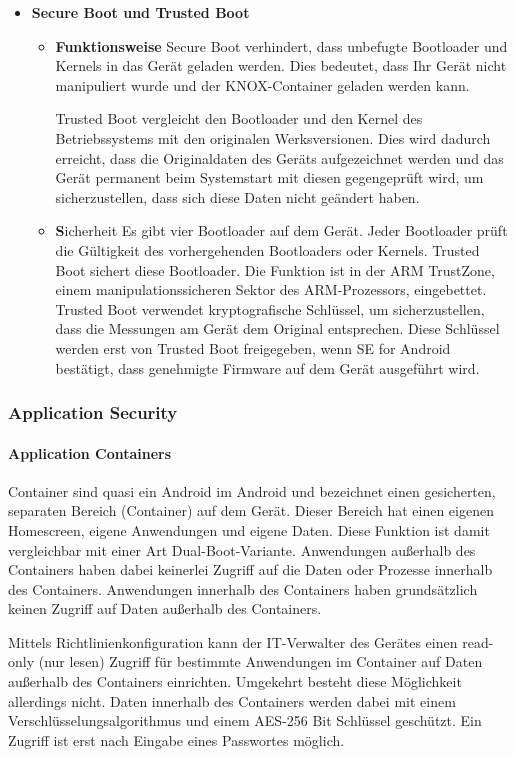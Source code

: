 \begin{itemize}
\begin{itemize}
	\end{itemize}
	\item \textbf{Secure Boot und Trusted Boot}
	\begin{itemize}
		\item \textbf{Funktionsweise} \newline Secure Boot verhindert, dass unbefugte Bootloader und Kernels in das Gerät geladen werden. Dies bedeutet, dass Ihr Gerät nicht manipuliert wurde und der KNOX-Container geladen werden kann. \par Trusted Boot vergleicht den Bootloader und den Kernel des Betriebssystems mit den originalen Werksversionen. Dies wird dadurch erreicht, dass die Originaldaten des Geräts aufgezeichnet werden und das Gerät permanent beim Systemstart mit diesen gegengeprüft wird, um sicherzustellen, dass sich diese Daten nicht geändert haben.
		\item \textbf Sicherheit \newline Es gibt vier Bootloader auf dem Gerät. Jeder Bootloader prüft die Gültigkeit des vorhergehenden Bootloaders oder Kernels. Trusted Boot sichert diese Bootloader. Die Funktion ist in der ARM TrustZone, einem manipulationssicheren Sektor des ARM-Prozessors, eingebettet. Trusted Boot verwendet kryptografische Schlüssel, um sicherzustellen, dass die Messungen am Gerät dem Original entsprechen. Diese Schlüssel werden erst von Trusted Boot freigegeben, wenn SE for Android bestätigt, dass genehmigte Firmware auf dem Gerät ausgeführt wird.
	\end{itemize}
\end{itemize}

\subsubsection{Application Security}
\paragraph{Application Containers}
Container sind quasi ein Android im Android und bezeichnet einen gesicherten, separaten Bereich (Container) auf dem Gerät. Dieser Bereich hat einen eigenen Homescreen, eigene Anwendungen und eigene Daten. Diese Funktion ist damit vergleichbar mit einer Art Dual-Boot-Variante. Anwendungen außerhalb des Containers haben dabei keinerlei Zugriff auf die Daten oder Prozesse innerhalb des Containers. Anwendungen innerhalb des Containers haben grundsätzlich keinen Zugriff auf Daten außerhalb des Containers. 
\par 
Mittels Richtlinienkonfiguration kann der IT-Verwalter des Gerätes einen read-only (nur lesen) Zugriff für bestimmte Anwendungen im Container auf Daten außerhalb des Containers einrichten. Umgekehrt besteht diese Möglichkeit allerdings nicht. Daten innerhalb des Containers werden dabei mit einem Verschlüsselungsalgorithmus und einem AES-256 Bit Schlüssel geschützt. Ein Zugriff ist erst nach Eingabe eines Passwortes möglich.
